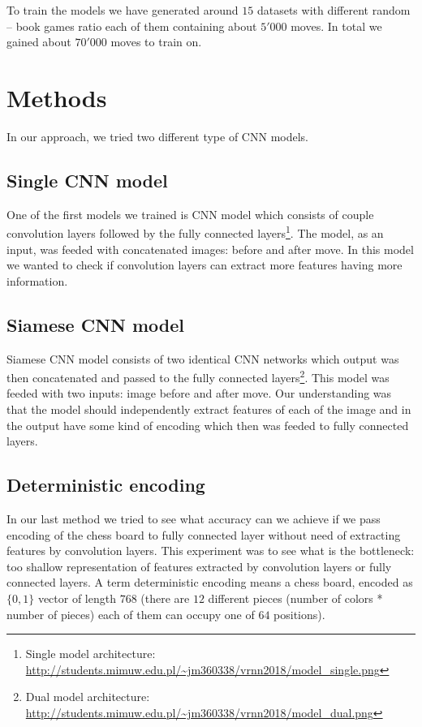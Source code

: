\documentclass[10pt,twocolumn,letterpaper]{article}
\begin{document}
To train the models we have generated around $15$ datasets with different random
-- book games ratio each of them containing about $5'000$ moves. In total we
gained about $70'000$ moves to train on.

\section{Methods}

In our approach, we tried two different type of CNN models.

\subsection{Single CNN model}

One of the first models we trained is CNN model which consists of couple
convolution layers followed by the fully connected layers\footnote{Single model
architecture:
\url{http://students.mimuw.edu.pl/~jm360338/vrnn2018/model_single.png}}. The
model, as an input, was feeded with concatenated images: before and after move.
In this model we wanted to check if convolution layers can extract more features
having more information.

\subsection{Siamese CNN model}

Siamese CNN model consists of two identical CNN networks which output was then
concatenated and passed to the fully connected layers\footnote{Dual model
architecture:
\url{http://students.mimuw.edu.pl/~jm360338/vrnn2018/model_dual.png}}. This
model was feeded with two inputs: image before and after move. Our understanding
was that the model should independently extract features of each of the image
and in the output have some kind of encoding which then was feeded to fully
connected layers.

\subsection{Deterministic encoding}

In our last method we tried to see what accuracy can we achieve if we pass
encoding of the chess board to fully connected layer without need of extracting
features by convolution layers. This experiment was to see what is the
bottleneck: too shallow representation of features extracted by convolution
layers or fully connected layers. A term deterministic encoding means a chess
board, encoded as $\{0,1\}$ vector of length $768$ (there are $12$ different
pieces (number of colors * number of pieces) each of them can occupy one of $64$
positions).
\end{document}
